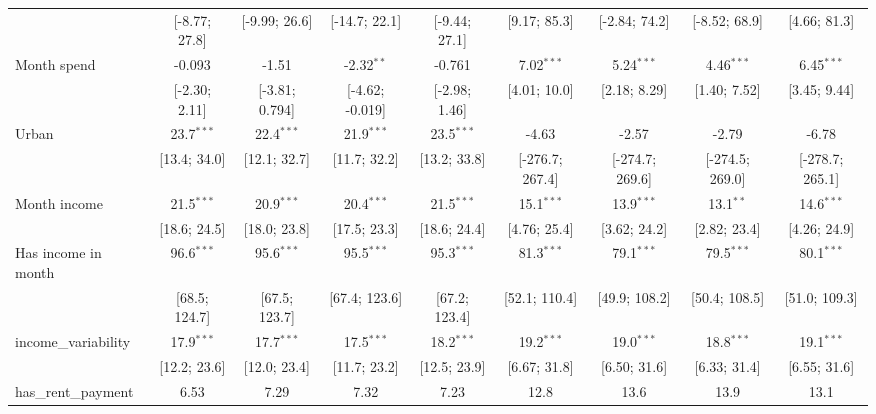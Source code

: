 \begin{table}[htbp]
\begin{threeparttable}[b]
\begin{tabular}{lcccccccc}
                                   & [-8.77; 27.8]  & [-9.99; 26.6]  & [-14.7; 22.1]   & [-9.44; 27.1]  & [9.17; 85.3]    & [-2.84; 74.2]   & [-8.52; 68.9]   & [4.66; 81.3]\\   
         Month spend               & -0.093         & -1.51          & -2.32$^{**}$    & -0.761         & 7.02$^{***}$    & 5.24$^{***}$    & 4.46$^{***}$    & 6.45$^{***}$\\   
                                   & [-2.30; 2.11]  & [-3.81; 0.794] & [-4.62; -0.019] & [-2.98; 1.46]  & [4.01; 10.0]    & [2.18; 8.29]    & [1.40; 7.52]    & [3.45; 9.44]\\   
         Urban                     & 23.7$^{***}$   & 22.4$^{***}$   & 21.9$^{***}$    & 23.5$^{***}$   & -4.63           & -2.57           & -2.79           & -6.78\\   
                                   & [13.4; 34.0]   & [12.1; 32.7]   & [11.7; 32.2]    & [13.2; 33.8]   & [-276.7; 267.4] & [-274.7; 269.6] & [-274.5; 269.0] & [-278.7; 265.1]\\   
         Month income              & 21.5$^{***}$   & 20.9$^{***}$   & 20.4$^{***}$    & 21.5$^{***}$   & 15.1$^{***}$    & 13.9$^{***}$    & 13.1$^{**}$     & 14.6$^{***}$\\   
                                   & [18.6; 24.5]   & [18.0; 23.8]   & [17.5; 23.3]    & [18.6; 24.4]   & [4.76; 25.4]    & [3.62; 24.2]    & [2.82; 23.4]    & [4.26; 24.9]\\   
         Has income in month       & 96.6$^{***}$   & 95.6$^{***}$   & 95.5$^{***}$    & 95.3$^{***}$   & 81.3$^{***}$    & 79.1$^{***}$    & 79.5$^{***}$    & 80.1$^{***}$\\   
                                   & [68.5; 124.7]  & [67.5; 123.7]  & [67.4; 123.6]   & [67.2; 123.4]  & [52.1; 110.4]   & [49.9; 108.2]   & [50.4; 108.5]   & [51.0; 109.3]\\   
         income\_variability       & 17.9$^{***}$   & 17.7$^{***}$   & 17.5$^{***}$    & 18.2$^{***}$   & 19.2$^{***}$    & 19.0$^{***}$    & 18.8$^{***}$    & 19.1$^{***}$\\   
                                   & [12.2; 23.6]   & [12.0; 23.4]   & [11.7; 23.2]    & [12.5; 23.9]   & [6.67; 31.8]    & [6.50; 31.6]    & [6.33; 31.4]    & [6.55; 31.6]\\   
         has\_rent\_payment        & 6.53           & 7.29           & 7.32            & 7.23           & 12.8            & 13.6            & 13.9            & 13.1\\   

\end{tabular}
\end{threeparttable}
\end{table}

